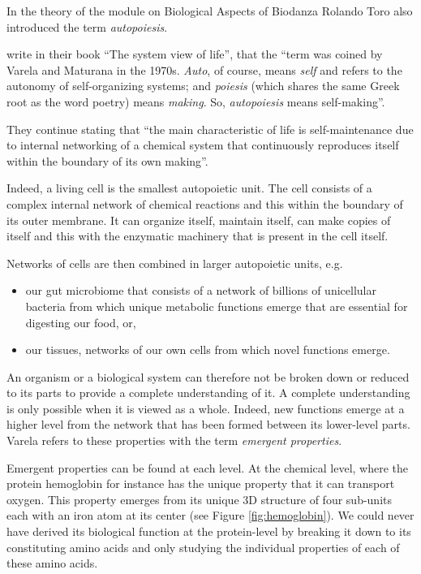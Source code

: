 \documentclass[
  11pt,
]{book}
\providecommand{\tightlist}{%
  \setlength{\itemsep}{0pt}\setlength{\parskip}{0pt}}
\begin{document}
In the theory of the module on Biological Aspects of Biodanza Rolando Toro also introduced the term \emph{autopoiesis}.

\citet{capraLuisi2014} write in their book ``The system view of life'', that the ``term was coined by Varela and Maturana in the 1970s. \emph{Auto}, of course, means \emph{self} and refers to the autonomy of self-organizing systems; and \emph{poiesis} (which shares the same Greek root as the word poetry) means \emph{making}. So, \emph{autopoiesis} means self-making''.

They continue stating that ``the main characteristic of life is self-maintenance due to internal networking of a chemical system that continuously reproduces itself within the boundary of its own making''.

Indeed, a living cell is the smallest autopoietic unit.
The cell consists of a complex internal network of chemical reactions and this within the boundary of its outer membrane.
It can organize itself, maintain itself, can make copies of itself and this with the enzymatic machinery that is present in the cell itself.

Networks of cells are then combined in larger autopoietic units, e.g.~

\begin{itemize}
\tightlist
\item
  our gut microbiome that consists of a network of billions of unicellular bacteria from which unique metabolic functions emerge that are essential for digesting our food, or,
\item
  our tissues, networks of our own cells from which novel functions emerge.
\end{itemize}

An organism or a biological system can therefore not be broken down or reduced to its parts to provide a complete understanding of it. A complete understanding is only possible when it is viewed as a whole.
Indeed, new functions emerge at a higher level from the network that has been formed between its lower-level parts. Varela refers to these properties with the term \emph{emergent properties}.

Emergent properties can be found at each level. At the chemical level, where the protein hemoglobin for instance has the unique property that it can transport oxygen. This property emerges from its unique 3D structure of four sub-units each with an iron atom at its center (see Figure \ref{fig:hemoglobin}). We could never have derived its biological function at the protein-level by breaking it down to its constituting amino acids and only studying the individual properties of each of these amino acids.
\end{document}

